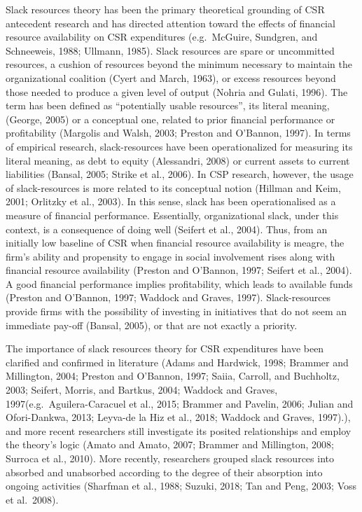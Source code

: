 \documentclass[
]{mitthesis}
\begin{document}
Slack resources theory has been the primary theoretical grounding of CSR antecedent research and has directed attention toward the effects of financial resource availability on CSR expenditures (e.g.~McGuire, Sundgren, and Schneeweis, 1988; Ullmann, 1985). Slack resources are spare or uncommitted resources, a cushion of resources beyond the minimum necessary to maintain the organizational coalition (Cyert and March, 1963), or excess resources beyond those needed to produce a given level of output (Nohria and Gulati, 1996). The term has been defined as ``potentially usable resources'', its literal meaning, (George, 2005) or a conceptual one, related to prior financial performance or profitability (Margolis and Walsh, 2003; Preston and O'Bannon, 1997). In terms of empirical research, slack-resources have been operationalized for measuring its literal meaning, as debt to equity (Alessandri, 2008) or current assets to current liabilities (Bansal, 2005; Strike et al., 2006). In CSP research, however, the usage of slack-resources is more related to its conceptual notion (Hillman and Keim, 2001; Orlitzky et al., 2003). In this sense, slack has been operationalised as a measure of financial performance. Essentially, organizational slack, under this context, is a consequence of doing well (Seifert et al., 2004). Thus, from an initially low baseline of CSR when financial resource availability is meagre, the firm's ability and propensity to engage in social involvement rises along with financial resource availability (Preston and O'Bannon, 1997; Seifert et al., 2004). A good financial performance implies profitability, which leads to available funds (Preston and O'Bannon, 1997; Waddock and Graves, 1997). Slack-resources provide firms with the possibility of investing in initiatives that do not seem an immediate pay-off (Bansal, 2005), or that are not exactly a priority.

The importance of slack resources theory for CSR expenditures have been clarified and confirmed in literature (Adams and Hardwick, 1998; Brammer and Millington, 2004; Preston and O'Bannon, 1997; Saiia, Carroll, and Buchholtz, 2003; Seifert, Morris, and Bartkus, 2004; Waddock and Graves, 1997(e.g.~Aguilera-Caracuel et al., 2015; Brammer and Pavelin, 2006; Julian and Ofori-Dankwa, 2013; Leyva-de la Hiz et al., 2018; Waddock and Graves, 1997).), and more recent researchers still investigate its posited relationships and employ the theory's logic (Amato and Amato, 2007; Brammer and Millington, 2008; Surroca et al., 2010). More recently, researchers grouped slack resources into absorbed and unabsorbed according to the degree of their absorption into ongoing activities (Sharfman et al., 1988; Suzuki, 2018; Tan and Peng, 2003; Voss et al.~2008).
\end{document}
